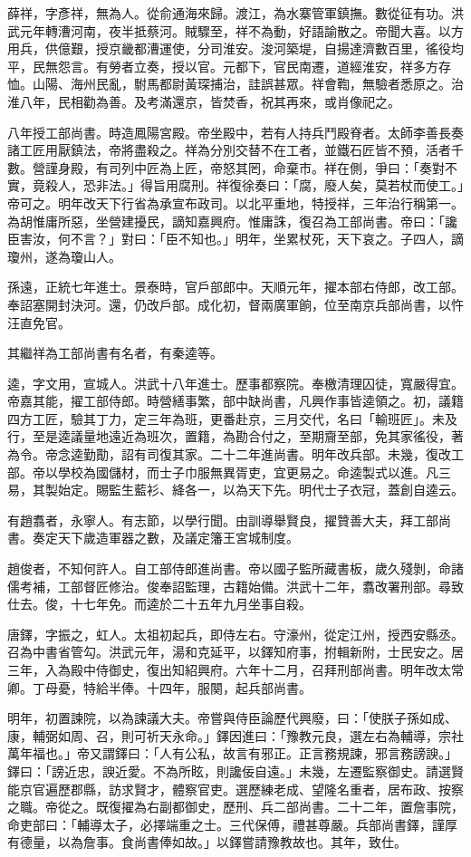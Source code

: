 \begin{pinyinscope}
薛祥，字彥祥，無為人。從俞通海來歸。渡江，為水寨管軍鎮撫。數從征有功。洪武元年轉漕河南，夜半抵蔡河。賊驟至，祥不為動，好語諭散之。帝聞大喜。以方用兵，供億艱，授京畿都漕運使，分司淮安。浚河築堤，自揚達濟數百里，徭役均平，民無怨言。有勞者立奏，授以官。元都下，官民南遷，道經淮安，祥多方存恤。山陽、海州民亂，駙馬都尉黃琛捕治，詿誤甚眾。祥會鞫，無驗者悉原之。治淮八年，民相勸為善。及考滿還京，皆焚香，祝其再來，或肖像祀之。

八年授工部尚書。時造鳳陽宮殿。帝坐殿中，若有人持兵鬥殿脊者。太師李善長奏諸工匠用厭鎮法，帝將盡殺之。祥為分別交替不在工者，並鐵石匠皆不預，活者千數。營謹身殿，有司列中匠為上匠，帝怒其罔，命棄市。祥在側，爭曰：「奏對不實，竟殺人，恐非法。」得旨用腐刑。祥復徐奏曰：「腐，廢人矣，莫若杖而使工。」帝可之。明年改天下行省為承宣布政司。以北平重地，特授祥，三年治行稱第一。為胡惟庸所惡，坐營建擾民，謫知嘉興府。惟庸誅，復召為工部尚書。帝曰：「讒臣害汝，何不言？」對曰：「臣不知也。」明年，坐累杖死，天下哀之。子四人，謫瓊州，遂為瓊山人。

孫遠，正統七年進士。景泰時，官戶部郎中。天順元年，擢本部右侍郎，改工部。奉詔塞開封決河。還，仍改戶部。成化初，督兩廣軍餉，位至南京兵部尚書，以忤汪直免官。

其繼祥為工部尚書有名者，有秦逵等。

逵，字文用，宣城人。洪武十八年進士。歷事都察院。奉檄清理囚徒，寬嚴得宜。帝嘉其能，擢工部侍郎。時營繕事繁，部中缺尚書，凡興作事皆逵領之。初，議籍四方工匠，驗其丁力，定三年為班，更番赴京，三月交代，名曰「輸班匠」。未及行，至是逵議量地遠近為班次，置籍，為勘合付之，至期齎至部，免其家徭役，著為令。帝念逵勤勩，詔有司復其家。二十二年進尚書。明年改兵部。未幾，復改工部。帝以學校為國儲材，而士子巾服無異胥吏，宜更易之。命逵製式以進。凡三易，其製始定。賜監生藍衫、絳各一，以為天下先。明代士子衣冠，蓋創自逵云。

有趙翥者，永寧人。有志節，以學行聞。由訓導舉賢良，擢贊善大夫，拜工部尚書。奏定天下歲造軍器之數，及議定籓王宮城制度。

趙俊者，不知何許人。自工部侍郎進尚書。帝以國子監所藏書板，歲久殘剝，命諸儒考補，工部督匠修治。俊奉詔監理，古籍始備。洪武十二年，翥改署刑部。尋致仕去。俊，十七年免。而逵於二十五年九月坐事自殺。

唐鐸，字振之，虹人。太祖初起兵，即侍左右。守濠州，從定江州，授西安縣丞。召為中書省管勾。洪武元年，湯和克延平，以鐸知府事，拊輯新附，士民安之。居三年，入為殿中侍御史，復出知紹興府。六年十二月，召拜刑部尚書。明年改太常卿。丁母憂，特給半俸。十四年，服闋，起兵部尚書。

明年，初置諫院，以為諫議大夫。帝嘗與侍臣論歷代興廢，曰：「使朕子孫如成、康，輔弼如周、召，則可祈天永命。」鐸因進曰：「豫教元良，選左右為輔導，宗社萬年福也。」帝又謂鐸曰：「人有公私，故言有邪正。正言務規諫，邪言務謗諛。」鐸曰：「謗近忠，諛近愛。不為所眩，則讒佞自遠。」未幾，左遷監察御史。請選賢能京官遍歷郡縣，訪求賢才，體察官吏。選歷練老成、望隆名重者，居布政、按察之職。帝從之。既復擢為右副都御史，歷刑、兵二部尚書。二十二年，置詹事院，命吏部曰：「輔導太子，必擇端重之士。三代保傅，禮甚尊嚴。兵部尚書鐸，謹厚有德量，以為詹事。食尚書俸如故。」以鐸嘗請豫教故也。其年，致仕。


\end{pinyinscope}
